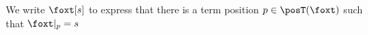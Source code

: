 We write \( \foxt[s] \) to express that there is a term position \( p\in\posT(\foxt) \) such that \( \foxt|_p = s \)